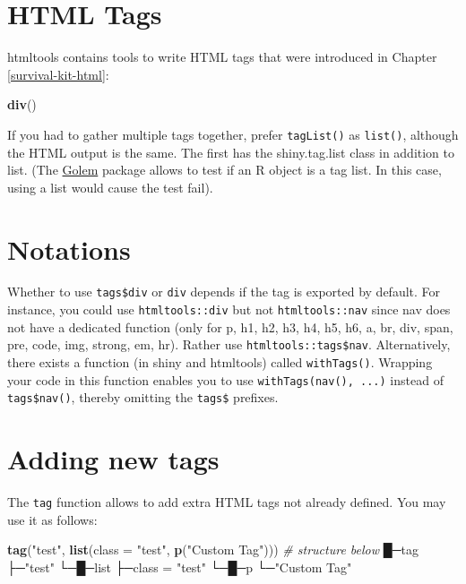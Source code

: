 \documentclass[]{book}
\newenvironment{Shaded}{\begin{snugshade}}{\end{snugshade}}
\newcommand{\CommentTok}[1]{\textcolor[rgb]{0.56,0.35,0.01}{\textit{#1}}}
\newcommand{\DataTypeTok}[1]{\textcolor[rgb]{0.13,0.29,0.53}{#1}}
\newcommand{\KeywordTok}[1]{\textcolor[rgb]{0.13,0.29,0.53}{\textbf{#1}}}
\newcommand{\NormalTok}[1]{#1}
\newcommand{\StringTok}[1]{\textcolor[rgb]{0.31,0.60,0.02}{#1}}
\begin{document}
\hypertarget{html-tags}{%
\section{HTML Tags}\label{html-tags}}

htmltools contains tools to write HTML tags that were introduced in Chapter \ref{survival-kit-html}:

\begin{Shaded}
\begin{Highlighting}[]
\KeywordTok{div}\NormalTok{()}
\end{Highlighting}
\end{Shaded}

If you had to gather multiple tags together, prefer \texttt{tagList()} as \texttt{list()}, although the HTML output is the same. The first has the shiny.tag.list class in addition to list. (The \href{http://golemverse.org}{Golem} package allows to test if an R object is a tag list. In this case, using a list would cause the test fail).

\hypertarget{notations}{%
\section{Notations}\label{notations}}

Whether to use \texttt{tags\$div} or \texttt{div} depends if the tag is exported by default.
For instance, you could use \texttt{htmltools::div} but not \texttt{htmltools::nav} since nav does not have a dedicated function (only for p, h1, h2, h3, h4, h5, h6, a, br, div, span, pre, code, img, strong, em, hr).
Rather use \texttt{htmltools::tags\$nav}. Alternatively, there exists a function (in shiny and htmltools)
called \texttt{withTags()}. Wrapping your code in this function enables you to use \texttt{withTags(nav(),\ ...)} instead of \texttt{tags\$nav()}, thereby omitting the \texttt{tags\$} prefixes.

\hypertarget{adding-new-tags}{%
\section{Adding new tags}\label{adding-new-tags}}

The \texttt{tag} function allows to add extra HTML tags not already defined. You may use it as follows:

\begin{Shaded}
\begin{Highlighting}[]
\KeywordTok{tag}\NormalTok{(}\StringTok{"test"}\NormalTok{, }\KeywordTok{list}\NormalTok{(}\DataTypeTok{class =} \StringTok{"test"}\NormalTok{, }\KeywordTok{p}\NormalTok{(}\StringTok{"Custom Tag"}\NormalTok{)))}
\CommentTok{# structure below}
\NormalTok{█─tag }
\NormalTok{├─}\StringTok{"test"} 
\NormalTok{└─█─list }
\NormalTok{├─class =}\StringTok{ "test"} 
\NormalTok{└─█─p }
\NormalTok{└─}\StringTok{"Custom Tag"} 
\end{Highlighting}
\end{Shaded}
\end{document}
